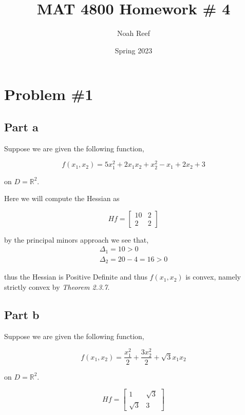 \documentclass{article}
\title{MAT 4800 Homework \# 4 }
\author{Noah Reef }
\date{Spring 2023}
\newcommand{\RR}{\mathbb{R}}
\begin{document}
\maketitle

\section*{Problem \#1}
\subsection*{Part a}
Suppose we are given the following function,

\begin{equation*}
    f(x_1,x_2) = 5x_1^2 + 2x_1x_2 + x_2^2 - x_1 + 2x_2 + 3
\end{equation*}

on $D = \RR^2$.

Here we will compute the Hessian as 

\begin{equation*}
    Hf = \begin{bmatrix*}
        10 & 2 \\
        2 & 2
    \end{bmatrix*}
\end{equation*}

by the principal minors approach we see that,
\begin{align*}
    \Delta_1 = 10 > 0 \\
    \Delta_2 = 20-4 = 16 > 0
\end{align*}

thus the Hessian is Positive Definite and thus $f(x_1,x_2)$ is convex, namely strictly convex by \textit{Theorem 2.3.7}.
\subsection*{Part b}
Suppose we are given the following function,

\begin{equation*}
    f(x_1,x_2) = \frac{x_1^2}{2} + \frac{3x_2^2}{2} + \sqrt{3}x_1x_2
\end{equation*}

on $D = \RR^2$.

\begin{equation*}
    Hf = \begin{bmatrix*}
        1 & \sqrt{3} \\
        \sqrt{3} & 3
    \end{bmatrix*}
\end{equation*}
\end{document}
